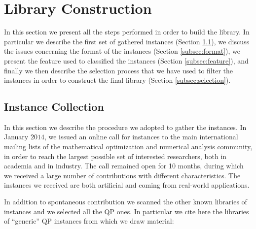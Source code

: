\section{Library Construction}\label{sec:lib}

In this section we present all the steps performed in order to build the library. In particular we describe the first set of gathered instances (Section \ref{subsec:instColl}), we discuss the issues concerning the format of the instances (Section \ref{subsec:format}), we present the feature used to classified the instances (Section \ref{subsec:feature}), and finally we then describe the selection process that we have used to filter the instances in order to construct the final library (Section \ref{subsec:selection}).

\subsection{Instance Collection}\label{subsec:instColl}

In this section we describe the procedure we adopted to gather the instances. In January $2014$, we issued an online call for instances to the main international mailing lists of the mathematical optimization and numerical analysis community, in order to reach the largest possible set of interested researchers, both in academia and in industry. The call remained open for 10 months, during which we received a large number of contributions with different characteristics. The instances we received  are both artificial and coming from real-world applications.

In addition to spontaneous contribution we scanned the other known libraries of instances and we selected all the QP ones. In particular we cite here the libraries of ``generic'' QP instances from which we draw material:

